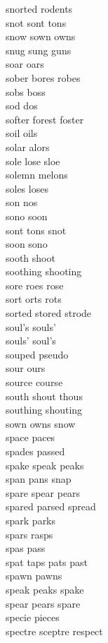 snorted rodents\\
snot sont tons\\
snow sown owns\\
snug sung guns\\
soar oars\\
sober bores robes\\
sobs boss\\
sod dos\\
softer forest foster\\
soil oils\\
solar alors\\
sole lose sloe\\
solemn melons\\
soles loses\\
son nos\\
sono soon\\
sont tons snot\\
soon sono\\
sooth shoot\\
soothing shooting\\
sore roes rose\\
sort orts rots\\
sorted stored strode\\
soul's souls'\\
souls' soul's\\
souped pseudo\\
sour ours\\
source course\\
south shout thous\\
southing shouting\\
sown owns snow\\
space paces\\
spades passed\\
spake speak peaks\\
span pans snap\\
spare spear pears\\
spared parsed spread\\
spark parks\\
spars rasps\\
spas pass\\
spat taps pats past\\
spawn pawns\\
speak peaks spake\\
spear pears spare\\
specie pieces\\
spectre sceptre respect\\
